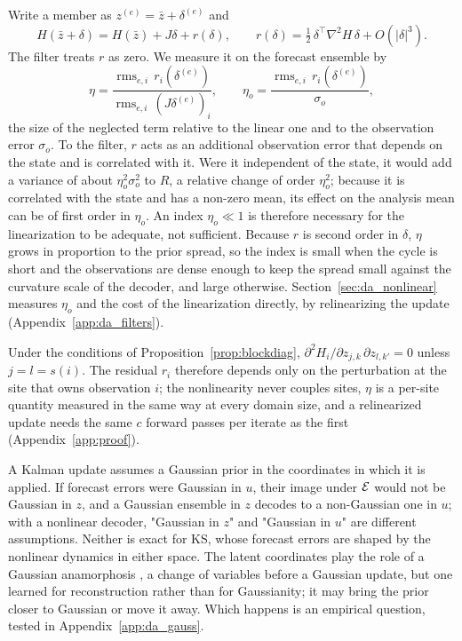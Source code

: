  Write a member as $z^{(e)}=\bar z+\delta^{(e)}$ and
\begin{equation}
  H(\bar z+\delta) = H(\bar z) + J\delta + r(\delta),\qquad
  r(\delta) = \tfrac12\,\delta^\top\nabla^2 H\,\delta + O(|\delta|^3).
  \label{eq:nl_expansion}
\end{equation}
The filter treats $r$ as zero. We measure it on the forecast ensemble by
\begin{equation}
  \eta = \frac{\operatorname{rms}_{e,i}\, r_i(\delta^{(e)})}{\operatorname{rms}_{e,i}\,(J\delta^{(e)})_i},
  \qquad
  \eta_o = \frac{\operatorname{rms}_{e,i}\, r_i(\delta^{(e)})}{\sigma_o},
  \label{eq:nl_index}
\end{equation}
the size of the neglected term relative to the linear one and to the
observation error $\sigma_o$. To the filter, $r$ acts as an additional
observation error that depends on the state and is correlated with it.
Were it independent of the state, it would add a variance of about
$\eta_o^2\sigma_o^2$ to $R$, a relative change of order $\eta_o^2$; because it is
correlated with the state and has a non-zero mean, its effect on the
analysis mean can be of first order in $\eta_o$. An index $\eta_o\ll1$ is
therefore necessary for the linearization to be adequate, not sufficient.
Because $r$ is second order in $\delta$, $\eta$ grows in proportion to the
prior spread, so the index is small when the cycle is short and the
observations are dense enough to keep the spread small against the
curvature scale of the decoder, and large otherwise. Section~\ref{sec:da_nonlinear}
measures $\eta_o$ and the cost of the linearization directly, by
relinearizing the update (Appendix~\ref{app:da_filters}).

\begin{remark}
\label{rem:local_curvature}
Under the conditions of Proposition~\ref{prop:blockdiag}, $\partial^2 H_i/\partial z_{j,k}\,\partial z_{l,k'}=0$
unless $j=l=s(i)$. The residual $r_i$ therefore depends only on the
perturbation at the site that owns observation $i$; the nonlinearity
never couples sites, $\eta$ is a per-site quantity measured in the same
way at every domain size, and a relinearized update needs the same $c$
forward passes per iterate as the first (Appendix~\ref{app:proof}).
\end{remark}

 A Kalman update assumes a Gaussian
prior in the coordinates in which it is applied. If forecast errors were
Gaussian in $u$, their image under $\mathcal{E}$ would not be Gaussian in $z$, and
a Gaussian ensemble in $z$ decodes to a non-Gaussian one in $u$; with a
nonlinear decoder, "Gaussian in $z$" and "Gaussian in $u$" are different
assumptions. Neither is exact for KS, whose forecast errors are shaped by
the nonlinear dynamics in either space. The latent coordinates play the
role of a Gaussian anamorphosis \citep{bertino2003,simonbertino2009}, a
change of variables before a Gaussian update, but one learned for
reconstruction rather than for Gaussianity; it may bring the prior closer
to Gaussian or move it away. Which happens is an empirical question,
tested in Appendix~\ref{app:da_gauss}.

